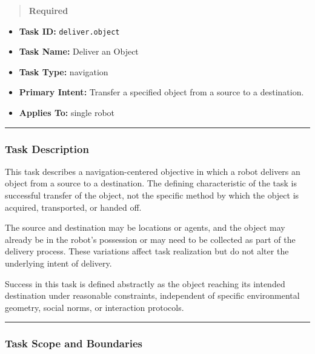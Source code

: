 \documentclass[utf8]{frontiers_suppmat} %
\providecommand{\tightlist}{%
  \setlength{\itemsep}{0pt}\setlength{\parskip}{0pt}}
\begin{document}
\begin{quote}
\textbf{Required}
\end{quote}

\begin{itemize}
\tightlist
\item
  \textbf{Task ID:} \texttt{deliver.object}\\
\item
  \textbf{Task Name:} Deliver an Object\\
\item
  \textbf{Task Type:} navigation\\
\item
  \textbf{Primary Intent:} Transfer a specified object from a source to
  a destination.\\
\item
  \textbf{Applies To:} single robot
\end{itemize}

\begin{center}\rule{0.5\linewidth}{0.5pt}\end{center}

\subsubsection{Task Description}\label{task-description}

This task describes a navigation-centered objective in which a robot
delivers an object from a source to a destination. The defining
characteristic of the task is successful transfer of the object, not the
specific method by which the object is acquired, transported, or handed
off.

The source and destination may be locations or agents, and the object
may already be in the robot's possession or may need to be collected as
part of the delivery process. These variations affect task realization
but do not alter the underlying intent of delivery.

Success in this task is defined abstractly as the object reaching its
intended destination under reasonable constraints, independent of
specific environmental geometry, social norms, or interaction protocols.

\begin{center}\rule{0.5\linewidth}{0.5pt}\end{center}

\subsubsection{Task Scope and
Boundaries}\label{task-scope-and-boundaries}
\end{document}
